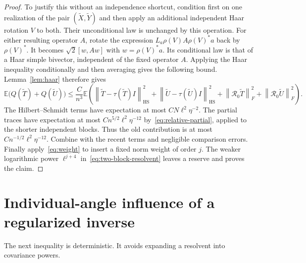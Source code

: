 \documentclass[11pt]{article}
\theoremstyle{definition}\newtheorem{definition}[theorem]{Definition}
\theoremstyle{remark}\newtheorem{remark}[theorem]{Remark}
\newcommand{\E}{\mathbb E}
\newcommand{\R}{\mathcal R}
\newcommand{\HS}{\mathrm{HS}}
\newcommand{\norm}[1]{\left\lVert#1\right\rVert}
\begin{document}
\begin{proof}
To justify this without an independence shortcut, condition first on one realization of the pair $(\widetilde X,\widetilde Y)$ and then apply an additional independent Haar rotation $V$ to both. Their unconditional law is unchanged by this operation. For either resulting operator $A$, rotate the expression $L_a\rho(V)A\rho(V)^*a$ back by $\rho(V)^*$. It becomes
$\sqrt2[w,Aw]$ with $w=\rho(V)^*a$. Its conditional law is that of a Haar simple bivector, independent of the fixed operator $A$. Applying the Haar inequality conditionally and then averaging gives the following bound.
 Lemma~\ref{lem:haar} therefore gives
\[
 \E\bigl(Q(\widetilde T)+Q(\widetilde U)\bigr)
 \le \frac C{n^3}\E\left(
 \norm{\widetilde T-\tau(\widetilde T)I}_{\HS}^2
 +\norm{\widetilde U-\tau(\widetilde U)I}_{\HS}^2
 +\norm{\R_0\widetilde T}_F^2+\norm{\R_0\widetilde U}_F^2\right).
\]
The Hilbert--Schmidt terms have expectation at most $C N\ell^2\eta^{-2}$. The partial traces have expectation at most $C n^{5/2}\ell^2\eta^{-12}$ by~\eqref{eq:relative-partial}, applied to the shorter independent blocks. Thus the old contribution is at most $C n^{-1/2}\ell^2\eta^{-12}$. Combine with the recent terms and negligible comparison errors. Finally apply~\eqref{eq:weight} to insert a fixed norm weight of order $j$. The weaker logarithmic power $\ell^{j+4}$ in~\eqref{eq:two-block-resolvent} leaves a reserve and proves the claim.
\end{proof}

\section{Individual-angle influence of a regularized inverse}\label{sec:influence}
The next inequality is deterministic. It avoids expanding a resolvent into covariance powers.
\end{document}
